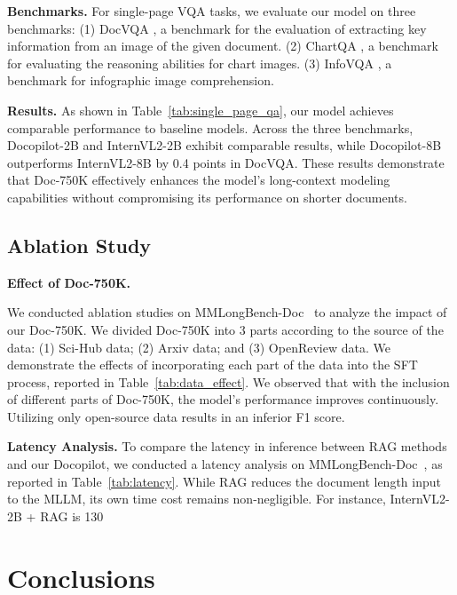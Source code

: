 \documentclass[10pt,twocolumn,letterpaper]{article}
\def\modelname{Docopilot\xspace}
\def\dataname{Doc-750K\xspace}
\begin{document}
\begin{CJK}{UTF8}{gbsn}
\noindent\textbf{Benchmarks.}
For single-page VQA tasks, we evaluate our model on three benchmarks:
(1) DocVQA \cite{mathew2021docvqa}, a benchmark for the evaluation of extracting key information from an image of the given document.
(2) ChartQA \cite{masry2022chartqa}, a benchmark for evaluating the reasoning abilities for chart images.
(3) InfoVQA \cite{mathew2022infographicvqa}, a benchmark for infographic image comprehension.

\noindent\textbf{Results.}
As shown in Table~\ref{tab:single_page_qa}, our model achieves 
comparable performance to baseline models. 
Across the three benchmarks, \modelname-2B and InternVL2-2B exhibit comparable results, while \modelname-8B outperforms InternVL2-8B by 0.4 points in DocVQA. These results demonstrate that \dataname effectively enhances the model's long-context modeling capabilities without compromising its performance on shorter documents.


\subsection{Ablation Study}

\noindent\textbf{Effect of \dataname.}

We conducted ablation studies on MMLongBench-Doc~\cite{ma2024mmlong} to analyze the impact of our \dataname. We divided \dataname into 3 parts according to the source of the data: (1) Sci-Hub data; (2) Arxiv data; and (3) OpenReview data. We demonstrate the effects of incorporating each part of the data into the SFT process, reported in Table~\ref{tab:data_effect}. 
We observed that with the inclusion of different parts of \dataname, the model's performance improves continuously. Utilizing only open-source data results in an inferior F1 score.



\noindent\textbf{Latency Analysis.}
To compare the latency in inference between RAG methods and our \modelname, we conducted a latency analysis on MMLongBench-Doc~\cite{ma2024mmlong}, as reported in Table~\ref{tab:latency}. While RAG reduces the document length input to the MLLM, its own time cost remains non-negligible. For instance, InternVL2-2B + RAG is 130\



\section{Conclusions}



\end{CJK}
\end{document}
